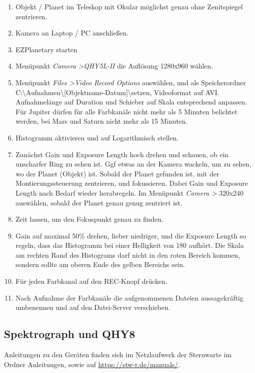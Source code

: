 \documentclass[10pt,a4paper,titlepage]{article}
\begin{document}
\begin{enumerate} 
\item Objekt / Planet im Teleskop mit Okular möglichst genau ohne Zenitspiegel zentrieren.
\item Kamera an Laptop / PC anschließen.
\item EZPlanetary starten
\item Menüpunkt \textit{Camera \textgreater QHY5L-II} die Auflösung 1280x960 wählen.
\item Menüpunkt \textit{Files \textgreater Video Record Options} auswählen, und als Speicherordner C:\textbackslash Aufnahmen\textbackslash [Objektname-Datum]\textbackslash setzen, Videoformat auf AVI. Aufnahmelänge auf Duration und Schieber auf Skala entsprechend anpassen. Für Jupiter dürfen für alle Farbkanäle nicht mehr als 5 Minuten belichtet werden, bei Mars und Saturn nicht mehr als 15 Minuten.
\item Histogramm aktivieren und auf Logarithmisch stellen.
\item Zunächst Gain und Exposure Length hoch drehen und schauen, ob ein unscharfer Ring zu sehen ist. Ggf etwas an der Kamera wackeln, um zu sehen, wo der Planet (Objekt) ist. Sobald der Planet gefunden ist, mit der Montierungssteuerung zentrieren, und fokussieren. Dabei Gain und Exposure Length nach Bedarf wieder herabregeln. Im Menüpunkt \textit{Camera \textgreater} 320x240 auswählen, sobald der Planet genau genug zentriert ist.
\item Zeit lassen, um den Fokuspunkt genau zu finden.
\item Gain auf maximal 50\% drehen, lieber niedriger, und die Exposure Length so regeln, dass das Histogramm bei einer Helligkeit von 180 aufhört. Die Skala am rechten Rand des Histograms darf nicht in den roten Bereich kommen, sondern sollte am oberen Ende des gelben Bereichs sein.
\item Für jeden Farbkanal auf den REC-Knopf drücken.
\item Nach Aufnahme der Farbkanäle die aufgenommenen Dateien aussagekräftig umbenennen und auf den Datei-Server verschieben.
\end{enumerate}

\subsection{Spektrograph und QHY8}
Anleitungen zu den Geräten finden sich im Netzlaufwerk der Sternwarte im Ordner Anleitungen, sowie auf \url{https://stw-r.de/manuals/}.
\end{document}
